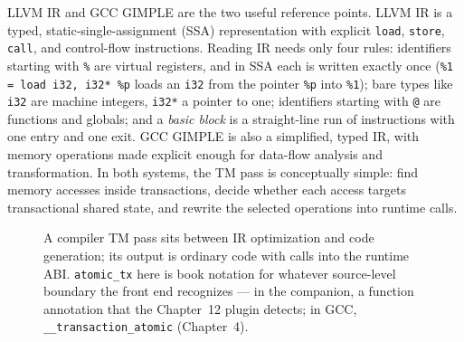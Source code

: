 LLVM IR and GCC GIMPLE are the two useful reference points. LLVM IR is a typed, static-single-assignment (SSA) representation with explicit \texttt{load}, \texttt{store}, \texttt{call}, and control-flow instructions. Reading IR needs only four rules: identifiers starting with \texttt{\%} are virtual registers, and in SSA each is written exactly once (\texttt{\%1 = load i32, i32* \%p} loads an \texttt{i32} from the pointer \texttt{\%p} into \texttt{\%1}); bare types like \texttt{i32} are machine integers, \texttt{i32*} a pointer to one; identifiers starting with \texttt{@} are functions and globals; and a \emph{basic block} is a straight-line run of instructions with one entry and one exit. GCC GIMPLE is also a simplified, typed IR, with memory operations made explicit enough for data-flow analysis and transformation. In both systems, the TM pass is conceptually simple: find memory accesses inside transactions, decide whether each access targets transactional shared state, and rewrite the selected operations into runtime calls.

\begin{figure}[htbp]
\centering
{}
\caption{A compiler TM pass sits between IR optimization and code generation; its output is ordinary code with calls into the runtime ABI. \texttt{atomic\_tx} here is book notation for whatever source-level boundary the front end recognizes --- in the companion, a function annotation that the Chapter~12 plugin detects; in GCC, \texttt{\_\_transaction\_atomic} (Chapter~4).}
\label{fig:compiler-tm-pass}
\end{figure}


